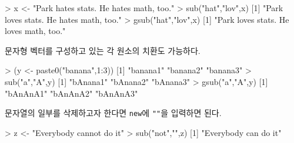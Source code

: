 \documentclass[
]{book}
\newenvironment{Shaded}{\begin{snugshade}}{\end{snugshade}}
\newcommand{\DecValTok}[1]{\textcolor[rgb]{0.00,0.00,0.81}{#1}}
\newcommand{\FunctionTok}[1]{\textcolor[rgb]{0.00,0.00,0.00}{#1}}
\newcommand{\NormalTok}[1]{#1}
\newcommand{\OtherTok}[1]{\textcolor[rgb]{0.56,0.35,0.01}{#1}}
\newcommand{\SpecialCharTok}[1]{\textcolor[rgb]{0.00,0.00,0.00}{#1}}
\newcommand{\StringTok}[1]{\textcolor[rgb]{0.31,0.60,0.02}{#1}}
\begin{document}
\begin{Shaded}
\begin{Highlighting}[]
\SpecialCharTok{\textgreater{}}\NormalTok{ x }\OtherTok{\textless{}{-}} \StringTok{"Park hates stats. He hates math, too."}
\SpecialCharTok{\textgreater{}} \FunctionTok{sub}\NormalTok{(}\StringTok{"hat"}\NormalTok{,}\StringTok{"lov"}\NormalTok{,x)}
\NormalTok{[}\DecValTok{1}\NormalTok{] }\StringTok{"Park loves stats. He hates math, too."}
\SpecialCharTok{\textgreater{}} \FunctionTok{gsub}\NormalTok{(}\StringTok{"hat"}\NormalTok{,}\StringTok{"lov"}\NormalTok{,x)}
\NormalTok{[}\DecValTok{1}\NormalTok{] }\StringTok{"Park loves stats. He loves math, too."}
\end{Highlighting}
\end{Shaded}

문자형 벡터를 구성하고 있는 각 원소의 치환도 가능하다.

\begin{Shaded}
\begin{Highlighting}[]
\SpecialCharTok{\textgreater{}}\NormalTok{ (y }\OtherTok{\textless{}{-}} \FunctionTok{paste0}\NormalTok{(}\StringTok{"banana"}\NormalTok{,}\DecValTok{1}\SpecialCharTok{:}\DecValTok{3}\NormalTok{))}
\NormalTok{[}\DecValTok{1}\NormalTok{] }\StringTok{"banana1"} \StringTok{"banana2"} \StringTok{"banana3"}
\SpecialCharTok{\textgreater{}} \FunctionTok{sub}\NormalTok{(}\StringTok{"a"}\NormalTok{,}\StringTok{"A"}\NormalTok{,y)}
\NormalTok{[}\DecValTok{1}\NormalTok{] }\StringTok{"bAnana1"} \StringTok{"bAnana2"} \StringTok{"bAnana3"}
\SpecialCharTok{\textgreater{}} \FunctionTok{gsub}\NormalTok{(}\StringTok{"a"}\NormalTok{,}\StringTok{"A"}\NormalTok{,y)}
\NormalTok{[}\DecValTok{1}\NormalTok{] }\StringTok{"bAnAnA1"} \StringTok{"bAnAnA2"} \StringTok{"bAnAnA3"}
\end{Highlighting}
\end{Shaded}

문자열의 일부를 삭제하고자 한다면 \texttt{new}에 \texttt{""}을 입력하면 된다.

\begin{Shaded}
\begin{Highlighting}[]
\SpecialCharTok{\textgreater{}}\NormalTok{ z }\OtherTok{\textless{}{-}} \StringTok{"Everybody cannot do it"}
\SpecialCharTok{\textgreater{}} \FunctionTok{sub}\NormalTok{(}\StringTok{"not"}\NormalTok{,}\StringTok{""}\NormalTok{,z)}
\NormalTok{[}\DecValTok{1}\NormalTok{] }\StringTok{"Everybody can do it"}
\end{Highlighting}
\end{Shaded}
\end{document}
